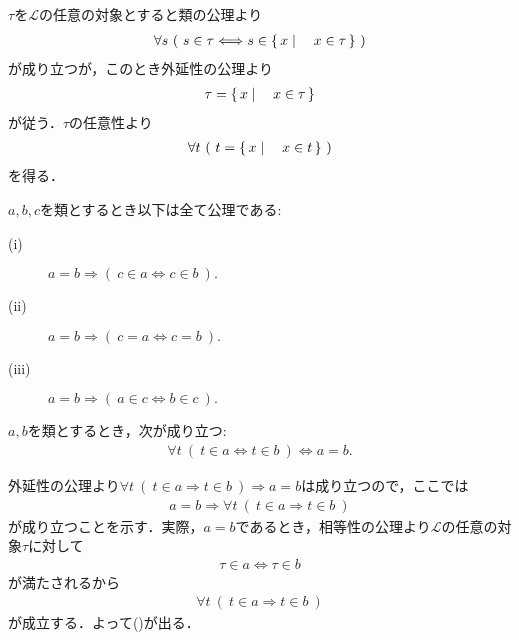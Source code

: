 	\begin{prf}
		$\tau$を$\mathcal{L}$の任意の対象とすると類の公理より
		\begin{align}
			\forall s\ (\ s \in \tau \Longleftrightarrow s \in \left\{\, x \mid \quad x \in \tau\, \right\}\ )
		\end{align}
		が成り立つが，このとき外延性の公理より
		\begin{align}
			\tau = \left\{\, x \mid \quad x \in \tau\, \right\}
		\end{align}
		が従う．$\tau$の任意性より
		\begin{align}
			\forall t\ (\ t = \left\{\, x \mid \quad x \in t\, \right\}\ )
		\end{align}
		を得る．
		\QED
	\end{prf}
	
	\begin{screen}
		\begin{axm}[相等性の公理]
			$a,b,c$を類とするとき以下は全て公理である:
			\begin{description}
				\item[(i)] $a=b \Longrightarrow (\ c \in a \Longleftrightarrow c \in b\ ).$
				\item[(ii)] $a=b \Longrightarrow (\ c = a \Longleftrightarrow c = b\ ).$
				\item[(iii)] $a=b \Longrightarrow (\ a \in c \Longleftrightarrow b \in c\ ).$
			\end{description}
		\end{axm}
	\end{screen}
	
	\begin{screen}
		\begin{thm}[外延性の公理は同値関係で成立する]\label{thm:axiom_of_extensionality_equivalent}
			$a,b$を類とするとき，次が成り立つ:
			\begin{align}
				\forall t\ (\ t \in a  \Longleftrightarrow t \in b\ )
				\Longleftrightarrow a=b.
			\end{align}
		\end{thm}
	\end{screen}
	
	\begin{prf}
		外延性の公理より$\forall t\ (\ t \in a  \Longrightarrow t \in b\ ) \Longrightarrow a=b$は成り立つので，ここでは
		\begin{align}
			a = b \Longrightarrow \forall t\ (\ t \in a  \Longrightarrow t \in b\ )
			\label{eq:thm_axiom_of_extensionality_equivalent_1}
		\end{align}
		が成り立つことを示す．実際，$a = b$であるとき，相等性の公理より$\mathcal{L}$の任意の対象$\tau$に対して
		\begin{align}
			\tau \in a \Longleftrightarrow \tau \in b
		\end{align}
		が満たされるから
		\begin{align}
			\forall t\ (\ t \in a  \Longrightarrow t \in b\ )
		\end{align}
		が成立する．よって()が出る．
		\QED
	\end{prf}
	
